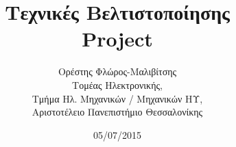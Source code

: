 \usepackage{multicol}
\newenvironment{Figure}
  {\par\medskip\noindent\minipage{\linewidth}}
  {\endminipage\par\medskip}

\usepackage{longtable}

\usepackage{fontspec}
\setmainfont{DejaVu Serif}
\renewcommand{\contentsname}{Περιεχόμενα}
\renewcommand{\listfigurename}{Λίστα Σχημάτων}
\renewcommand{\figurename}{Σχήμα}
\renewcommand{\lstlistingname}{Καταχώρηση}%
\renewcommand{\lstlistlistingname}{List of \lstlistingname s}




\title{Τεχνικές Βελτιστοποίησης\\Project}
\author{Ορέστης Φλώρος-Μαλιβίτσης\\
  Τομέας Ηλεκτρονικής,\\
  Τμήμα Ηλ. Μηχανικών / Μηχανικών ΗΥ,\\
  Αριστοτέλειο Πανεπιστήμιο Θεσσαλονίκης}
\date{05/07/2015}


\maketitle
\tableofcontents
\newpage

